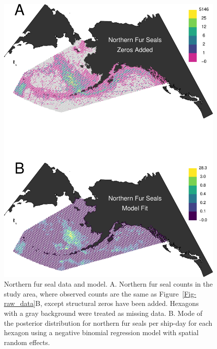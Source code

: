 \documentclass[11pt, titlepage]{article}
\begin{document}
\begin{spacing}{1.9}
\begin{flushleft}
\begin{figure}[H]
  \begin{center}
  \includegraphics[width=.75\linewidth]{figures/Fig-FurSealFit-crop}
  \end{center}
  \caption{Northern fur seal data and model. A. Northern fur seal counts in the study area, where observed counts are the same as Figure~\ref{Fig-raw_data}B, except structural zeros have been added. Hexagons with a gray background were treated as missing data. B. Mode of the posterior distribution for northern fur seals per ship-day for each hexagon using a negative binomial regression model with spatial random effects.   \label{Fig-FurSealFit}}         
\end{figure} 


\end{flushleft}
\end{spacing}
\end{document}

